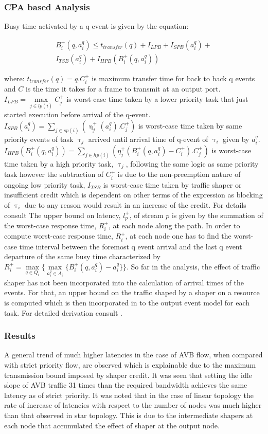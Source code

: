 \documentclass[journal,12pt,twocolumn]{IEEEtran}
\begin{document}
\subsubsection{CPA based Analysis}
Busy time activated by a q event is given by the equation:

\begin{align*}
\label{Busytime}
B_i^+(q,a_i^q)\leq t_{transfer}(q)+I_{LPB}+I_{SPB}(a_i^q)+\\
			I_{TSB}(a_i^q)+I_{HPB}(B_i^+(q,a_i^q))
\end{align*}

where: $t_{transfer}(q) = q.C_i^+$ is maximum transfer time for back to back q events and $C$ is the time it takes for a frame to transmit at an output port. $I_{LPB}=\max\limits_{j\in lp(i)} C_j^+$ is worst-case time taken by a lower priority task that just started execution before arrival of the q-event. $I_{SPB}(a_i^q)=\sum\limits_{j\in sp(i)} (\upeta_j^+(a_i^q).C_j^+)$ is worst-case time taken by same priority events of task $\uptau_j$ arrived until arrival time of q-event of $\uptau_i$ given by $a_i^q$. $I_{HPB}(B_i^+(q,a_i^q))=\sum\limits_{j\in hp(i)} (\eta_j^+(B_i^+(q,a_i^q)-C_i^+).C_j^+)$ is worst-case time taken by a high priority task, $\uptau_j$, following the same logic as same priority task however the subtraction of $C_i^+$ is due to the non-preemption nature of ongoing low priority task, $I_{TSB}$ is worst-case time taken by traffic shaper or insufficient credit which is dependent on other terms of the expression as blocking of $\uptau_i$ due to any reason would result in an increase of the credit. For details consult \cite{CPA}
The upper bound on latency, $l_{p}^+$, of stream $p$ is given by the summation of the worst-case response time, $R_i^+$, at each node along the path. In order to compute worst-case response time, $R_i^+$, at each node one has to find the worst-case time interval between the foremost q event arrival and the last q event departure of the same busy time characterized by $R_i^+=\max\limits_{q\in Q_i}\big\{ \max\limits_{a_i^q\in A_i}\{B_i^+(q,a_i^q)-a_i^q\}\big\}$. 
So far in the analysis, the effect of traffic shaper has not been incorporated into the calculation of arrival times of the events. For that, an upper bound on the traffic shaped by a shaper on a resource is computed which is then incorporated in to the output event model for each task. For detailed derivation consult \cite{CPA}.
\subsubsection {Results}
A general trend of much higher latencies in the case of AVB flow, when compared with strict priority flow, are observed which is explainable due to the maximum transmission bound imposed by shaper credit. It was seen that setting the idle slope of AVB traffic 31 times than the required bandwidth achieves the same latency as of strict priority. It was noted that in the case of linear topology the rate of increase of latencies with respect to the number of nodes was much higher than that observed in star topology. This is due to the intermediate shapers at each node that accumulated the effect of shaper at the output node.
\end{document}
